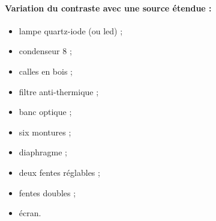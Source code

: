 \paragraph{Variation du contraste avec une source étendue :}
\begin{itemize}
\item lampe quartz-iode (ou led) ;
\item condenseur \unit{8}{\centi\meter} ;
\item calles en bois ;
\item filtre anti-thermique ;
\item banc optique ;
\item six montures ;
\item diaphragme ;
\item deux fentes réglables ;
\item fentes doubles ;
\item écran.
\end{itemize}

\newpage